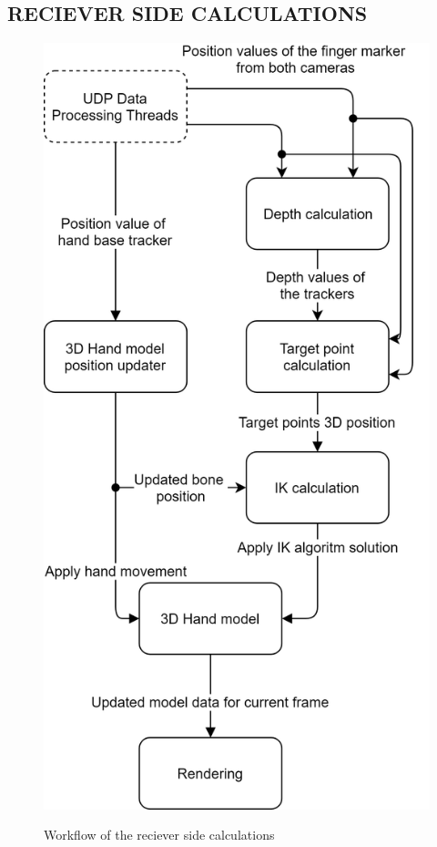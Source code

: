 \subsection{RECIEVER SIDE CALCULATIONS}
\begin{figure}[ht]
\centering
	\includegraphics[width=\columnwidth/2]{images/Rendering_workflow.png}
	\label{fig:reciever_side_calculations} 
	\caption{Workflow of the reciever side calculations}
\end{figure}
